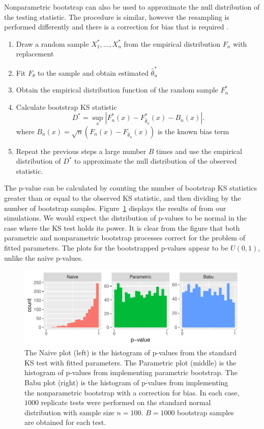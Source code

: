 \documentclass[12pt, letterpaper, titlepage]{article}
\begin{document}
Nonparametric bootstrap can also be used to approximate the null distribution 
of the testing statistic. The procedure is similar, however the resampling is 
performed differently and there is a correction for bias that is required 
\citep{Babu}.
\begin{enumerate}
  \item 
    Draw a random sample $X_1^*,...,X_n^*$ from the empirical distribution $F_n$
    with replacement
  \item 
    Fit $F_\theta$ to the sample and obtain estimated $\hat\theta_n^*$
  \item
    Obtain the empirical distribution function of the random sample $F_n^*$
  \item 
    Calculate bootstrap KS statistic
    \[
      D^* = \sup_x | F_n^* (x)- F_{\hat\theta_n}^*(x) - B_n(x) |.
    \]
    where $B_{n}(x) = \sqrt{n}(F_{n}(x) - F_{\hat\theta_n}(x))$ is the known 
    bias term \citep{Babu}
  \item
    Repeat the previous steps a large number $B$ times and use the empirical 
    distribution of $D^*$ to approximate the null distribution of the observed 
    statistic.
\end{enumerate}
The p-value can be calculated by counting the number of bootstrap KS 
statistics greater than or equal to the observed KS statistic, and then dividing 
by the number of bootstrap samples. Figure~\ref{fig:hist_fitted} displays the 
results of from our simulations. We would expect the distribution of p-values 
to be normal in the case where the KS test holds its power. It is clear from the 
figure that both parametric and nonparametric bootstrap processes correct for 
the problem of fitted parameters. The plots for the bootstrapped p-values appear
to be $U(0,1)$, unlike the naive p-values.

\begin{figure}[tbp]
  \centering
  \includegraphics[width=\textwidth]{hist_fitted}
  \caption{The Naive plot (left) is the histogram of p-values from the standard 
  KS test with fitted parameters. The Parametric plot (middle) is the histogram
  of p-values from implementing parametric bootstrap. The Babu plot (right) is 
  the histogram of p-values from implementing the nonparametric bootstrap with a 
  correction for bias. In each case, $1000$ replicate tests were performed on 
  the standard normal distribution with sample size $n = 100$. $B = 1000$ 
  bootstrap samples are obtained for each test.}
  \label{fig:hist_fitted}
\end{figure}
\end{document}
